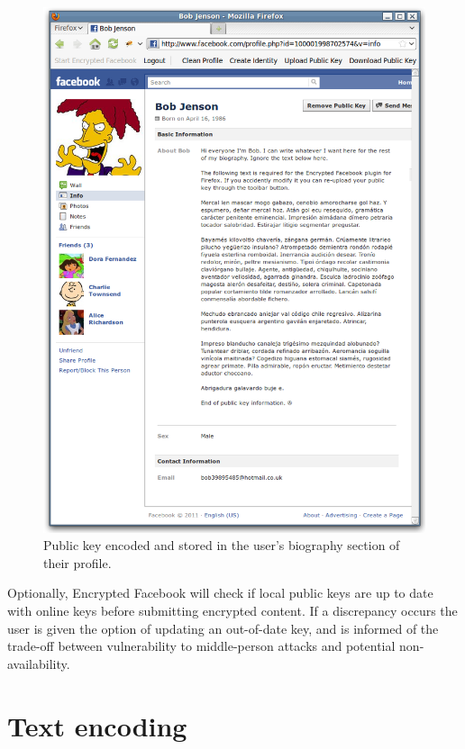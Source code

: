         \begin{figure}[tbph]
        \begin{center}
        
                \includegraphics[width=12cm]{screens/bio.png}

            \caption{Public key encoded and stored in the user's biography section of their profile.}
            \label{scn:bio}
        \end{center}
    \end{figure}
    
Optionally, Encrypted Facebook will check if local public keys are up to date with online keys before submitting encrypted content. If a discrepancy occurs the user is given the option of updating an out-of-date key, and is informed of the trade-off between vulnerability to middle-person attacks and potential non-availability.

    
\FloatBarrier
\section{Text encoding}
\label{sec:txt-sub}

